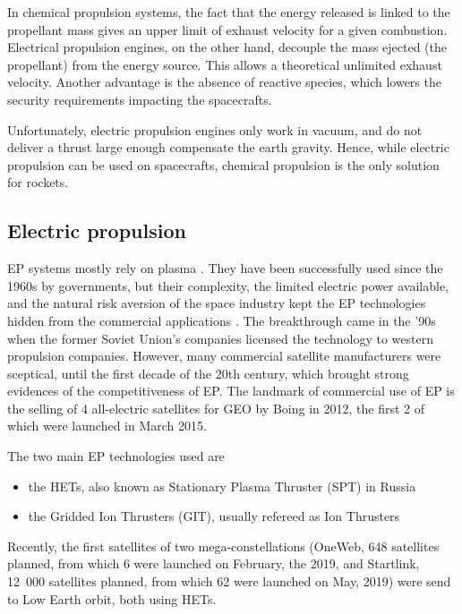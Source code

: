 In chemical propulsion systems, the fact that the energy released is linked to the propellant mass gives an upper limit of exhaust velocity for a given combustion.
Electrical propulsion engines, on the other hand, decouple the mass ejected (the propellant) from the energy source.
This allows a theoretical unlimited exhaust velocity.
Another advantage is the absence of reactive species, which lowers the security requirements impacting the spacecrafts.

Unfortunately, electric propulsion engines only work in vacuum, and do not deliver a thrust large enough compensate the earth gravity.
Hence, while electric propulsion can be used on spacecrafts, chemical propulsion is the only solution for rockets.

\subsection*{Electric propulsion} \label{subsec-label}
\ac{EP} systems mostly rely on plasma \citep{charles2009,mazouffre2016}.
They have been successfully used since the 1960s by governments, but their complexity, the limited electric power available, and the natural risk aversion of the space industry kept the \ac{EP} technologies hidden from the commercial applications \citep{lev2019}.
The breakthrough came in the '90s when the former Soviet Union's companies licensed the technology to western propulsion companies.
However, many commercial satellite manufacturers were sceptical, until the first decade of the 20th century, which brought strong evidences of the competitiveness of \ac{EP}.
The landmark of commercial use of \ac{EP} is the selling of 4 all-electric satellites for \ac{GEO} by Boing in 2012, the first 2 of which were launched in March 2015.

The two main \ac{EP} technologies used are
\begin{itemize}
  \item the \ac{HET}s, also known as Stationary Plasma Thruster (SPT) in Russia
  \item the Gridded Ion Thrusters (GIT), usually refereed as Ion Thrusters
\end{itemize}

Recently, the first satellites of two mega-constellations (OneWeb, 648 satellites planned, from which 6 were launched on February, the  2019, and Startlink, 12~000 satellites planned, from which 62 were launched on May,  2019) were send to Low Earth orbit, both using \ac{HET}s. 


